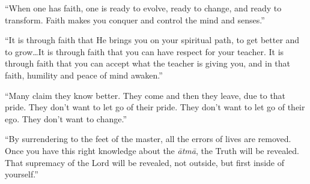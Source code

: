 \enquote{When one has faith, one is ready to evolve, ready to change, and ready to transform. Faith makes you conquer and control the mind and senses.}

\enquote{It is through faith that He brings you on your spiritual path, to get better and to grow\ldots It is through faith that you can have respect for your teacher. It is through faith that you can accept what the teacher is giving you, and in that faith, humility and peace of mind awaken.}

\enquote{Many claim they know better. They come and then they leave, due to that pride. They don’t want to let go of their pride. They don’t want to let go of their ego. They don’t want to change.}

\enquote{By surrendering to the feet of the master, all the errors of lives are removed. Once you have this right knowledge about the \textit{ātmā}, the Truth will be revealed. That supremacy of the Lord will be revealed, not outside, but first inside of yourself.}
